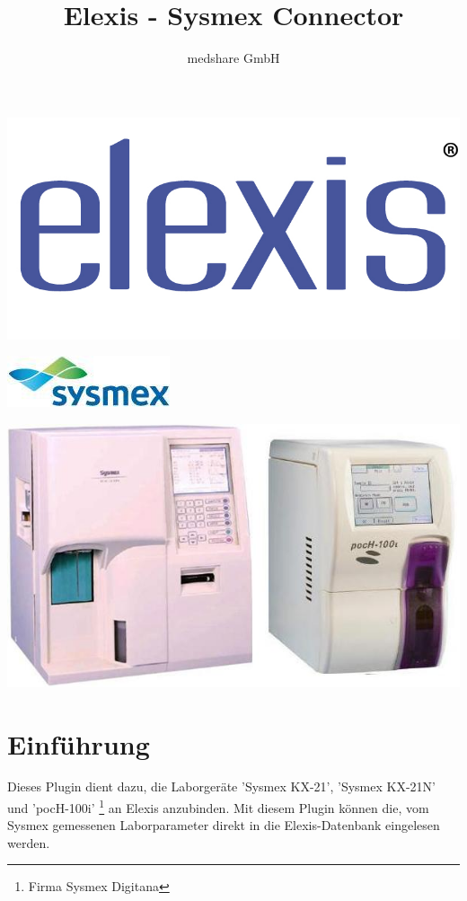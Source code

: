 \documentclass[a4paper]{scrartcl}
\title{Elexis - Sysmex Connector}
\author{medshare GmbH}
\begin{document}
\maketitle
	\begin{center}
		\includegraphics{elexis_logo}
	\end{center}
	\begin{center}
		\includegraphics{sysmex_logo}
	\end{center}
	\begin{center}
		\includegraphics{sysmex_device}
	\end{center}
\pagebreak


\section{Einf\"uhrung}
Dieses Plugin dient dazu, die Laborger\"ate 'Sysmex KX-21', 'Sysmex KX-21N' und 'pocH-100i' \footnote{Firma Sysmex Digitana} an Elexis anzubinden. Mit diesem Plugin k\"onnen die, vom Sysmex gemessenen Laborparameter direkt in die Elexis-Datenbank eingelesen werden.
\end{document}
